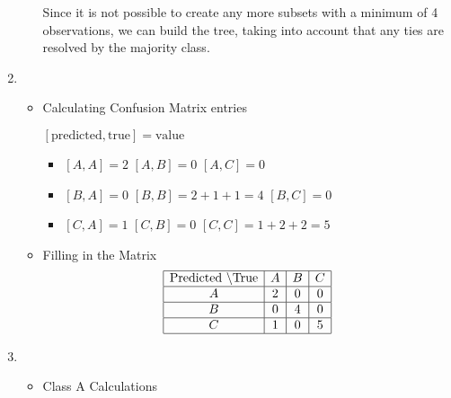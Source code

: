 \documentclass[12pt]{article}
\begin{document}
\begin{enumerate}[leftmargin=\labelsep, label=\textbf{\arabic*.)}]
\begin{itemize}
                    Since it is not possible to create any more subsets with a minimum of 4 observations, we can build the tree, taking into account that any ties are resolved by the majority class. \\

          \end{itemize}
    \item \begin{itemize}
              \item Calculating Confusion Matrix entries

                    $[\text{predicted}, \text{true}] = \text{value}$
                    \begin{itemize}
                        \item $[A, A] = 2$ \hspace{1cm} $[A, B] = 0$ \hspace{1cm} $[A, C] = 0$
                        \item $[B, A] = 0$ \hspace{1cm} $[B, B] = 2 + 1 + 1 = 4$ \hspace{1cm} $[B, C] = 0$
                        \item $[C, A] = 1$ \hspace{1cm} $[C, B] = 0$ \hspace{1cm} $[C, C] = 1 + 2 + 2 = 5$
                    \end{itemize}
              \item Filling in the Matrix
                    \[
                        \begin{array}{|c|c|c|c|}
                            \hline
                            \text{Predicted \textbackslash True} & A & B & C \\
                            \hline
                            A                                    & 2 & 0 & 0 \\
                            \hline
                            B                                    & 0 & 4 & 0 \\
                            \hline
                            C                                    & 1 & 0 & 5 \\
                            \hline
                        \end{array}
                    \]
          \end{itemize}
    \item \begin{itemize}
              \item Class A Calculations


\end{itemize}
\end{enumerate}
\end{document}
